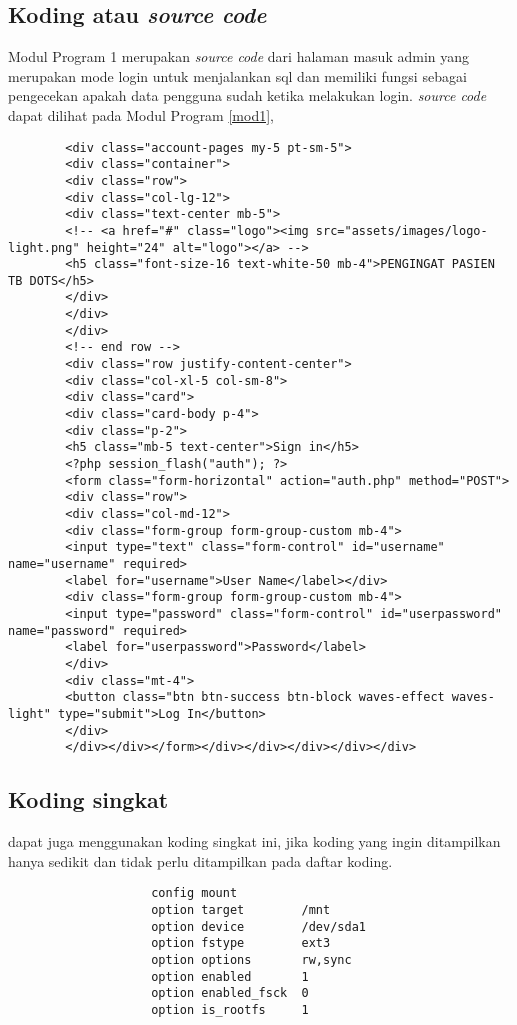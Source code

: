 		\subsection{Koding atau \textit{source code}}
		Modul Program 1 merupakan \textit{source code }dari halaman masuk admin yang merupakan mode login untuk menjalankan sql dan memiliki fungsi sebagai pengecekan apakah data pengguna sudah ketika melakukan login. \textit{source code} dapat dilihat pada Modul Program \ref{mod1}, 
\begin{code}
	\singlespacing
	\begin{verbatim}
		<div class="account-pages my-5 pt-sm-5">
		<div class="container">
		<div class="row">
		<div class="col-lg-12">
		<div class="text-center mb-5">
		<!-- <a href="#" class="logo"><img src="assets/images/logo-light.png" height="24" alt="logo"></a> -->
		<h5 class="font-size-16 text-white-50 mb-4">PENGINGAT PASIEN TB DOTS</h5>
		</div>
		</div>
		</div>
		<!-- end row -->
		<div class="row justify-content-center">
		<div class="col-xl-5 col-sm-8">
		<div class="card">
		<div class="card-body p-4">
		<div class="p-2">
		<h5 class="mb-5 text-center">Sign in</h5>
		<?php session_flash("auth"); ?>
		<form class="form-horizontal" action="auth.php" method="POST">
		<div class="row">
		<div class="col-md-12">
		<div class="form-group form-group-custom mb-4">
		<input type="text" class="form-control" id="username" name="username" required>
		<label for="username">User Name</label></div>
		<div class="form-group form-group-custom mb-4">
		<input type="password" class="form-control" id="userpassword" name="password" required>
		<label for="userpassword">Password</label>
		</div>
		<div class="mt-4">
		<button class="btn btn-success btn-block waves-effect waves-light" type="submit">Log In</button>
		</div>
		</div></div></form></div></div></div></div></div>
	\end{verbatim}
	\begin{center}
		\label{mod1} 
	\end{center}
\end{code}

\subsection{Koding singkat}
dapat juga menggunakan koding singkat ini, jika koding yang ingin ditampilkan hanya sedikit dan tidak perlu ditampilkan pada daftar koding.
			
			\begingroup
			\begin{singlespace}
				 \fontsize{10pt}{12pt}\selectfont
				\begin{verbatim}
					config mount
					option target        /mnt
					option device        /dev/sda1
					option fstype        ext3
					option options       rw,sync
					option enabled       1
					option enabled_fsck  0
					option is_rootfs     1
				\end{verbatim}  
			\end{singlespace}
			\endgroup

